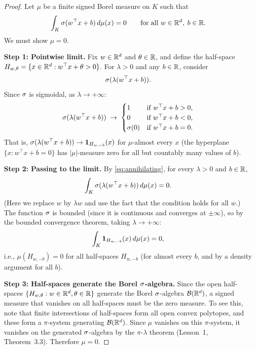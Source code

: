 \documentclass[11pt,a4paper]{article}
\begin{document}
\begin{proof}
Let $\mu$ be a finite signed Borel measure on $K$ such that
\begin{equation}
\label{eq:annihilating}
  \int_K \sigma(w^\top x + b) \, d\mu(x) = 0
  \qquad \text{for all } w \in \mathbb{R}^d, \; b \in \mathbb{R}.
\end{equation}
We must show $\mu = 0$.

\textbf{Step 1: Pointwise limit.}
Fix $w \in \mathbb{R}^d$ and $\theta \in \mathbb{R}$, and define the half-space
$H_{w,\theta} = \{x \in \mathbb{R}^d : w^\top x + \theta > 0\}$.  For
$\lambda > 0$ and any $b \in \mathbb{R}$, consider
\[
  \sigma(\lambda(w^\top x + b)).
\]
Since $\sigma$ is sigmoidal, as $\lambda \to +\infty$:
\[
  \sigma(\lambda(w^\top x + b))
  \;\to\;
  \begin{cases}
    1 & \text{if } w^\top x + b > 0, \\
    0 & \text{if } w^\top x + b < 0, \\
    \sigma(0) & \text{if } w^\top x + b = 0.
  \end{cases}
\]
That is, $\sigma(\lambda(w^\top x + b)) \to \mathbf{1}_{H_{w,-b}}(x)$
for $\mu$-almost every $x$ (the hyperplane $\{x : w^\top x + b = 0\}$ has
$|\mu|$-measure zero for all but countably many values of $b$).

\textbf{Step 2: Passing to the limit.}
By \eqref{eq:annihilating}, for every $\lambda > 0$ and $b \in \mathbb{R}$,
\[
  \int_K \sigma(\lambda(w^\top x + b)) \, d\mu(x) = 0.
\]
(Here we replace $w$ by $\lambda w$ and use the fact that the condition
holds for all $w$.)
The function $\sigma$ is bounded (since it is continuous and converges at
$\pm\infty$), so by the bounded convergence theorem, taking
$\lambda \to +\infty$:
\[
  \int_K \mathbf{1}_{H_{w,-b}}(x) \, d\mu(x) = 0,
\]
i.e., $\mu(H_{w,-b}) = 0$ for all half-spaces $H_{w,-b}$ (for almost
every $b$, and by a density argument for all $b$).

\textbf{Step 3: Half-spaces generate the Borel $\sigma$-algebra.}
Since the open half-spaces $\{H_{w,\theta} : w \in \mathbb{R}^d, \theta \in \mathbb{R}\}$
generate the Borel $\sigma$-algebra $\mathcal{B}(\mathbb{R}^d)$, a signed measure that
vanishes on all half-spaces must be the zero measure.  To see this, note
that finite intersections of half-spaces form all open convex polytopes, and
these form a $\pi$-system generating $\mathcal{B}(\mathbb{R}^d)$.  Since $\mu$ vanishes
on this $\pi$-system, it vanishes on the generated $\sigma$-algebra by
the $\pi$-$\lambda$ theorem (Lesson~1, Theorem~3.3).  Therefore $\mu = 0$.
\end{proof}
\end{document}
